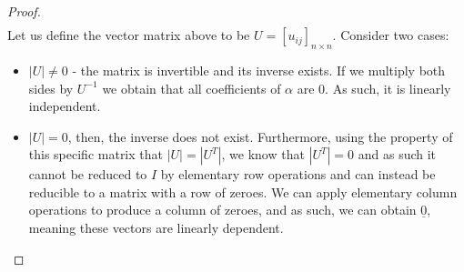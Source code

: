 \documentclass[a4paper]{article}
\theoremstyle{plain}
\newtheorem{thm}{Theorem}[section]
\theoremstyle{definition}
\theoremstyle{remark}
\begin{document}
\begin{tcolorbox}[colback=black!3!white,colframe=black!60!white,title=\begin{thm}Linear Independence using Determinant \label{Linear Independence using Determinant}\end{thm}]
\begin{proof}
\begin{align}
		\end{align} Let us define the vector matrix above to be $U = [u_{ij}]_{n \times n}$.
		Consider two cases:
		\begin{itemize}
			\item $|U| \neq  0 $ - the matrix is invertible and its inverse exists. If we multiply both sides by $U^{-1}$ we obtain that all coefficients of $\alpha$ are $0$. As such, it is linearly independent.
			\item $|U| = 0$, then, the inverse does not exist. Furthermore, using the property of this specific matrix that $|U| = |U^{T}|$, we know that $|U^{T}| = 0$ and as such it cannot be reduced to $I$ by elementary row operations and can instead be reducible to a matrix with a row of zeroes. We can apply elementary column operations to produce a column of zeroes, and as such, we can obtain $\underline{0}$, meaning these vectors are linearly dependent.

		\end{itemize}
	\end{proof}
\end{tcolorbox}
\end{document}
